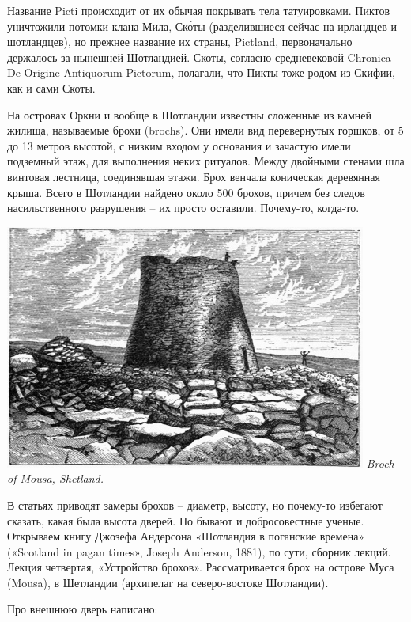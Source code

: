 Название Picti происходит от их обычая покрывать тела татуировками. Пиктов уничтожили потомки клана Мила, Ск\'оты (разделившиеся сейчас на ирландцев и шотландцев), но прежнее название их страны, Pictland, первоначально держалось за нынешней Шотландией. Скоты, согласно средневековой Chronica De Origine Anti\-quorum Pictorum, полагали, что Пикты тоже родом из Скифии, как и сами Скоты.

На островах Оркни и вообще в Шотландии известны сложенные из камней жилища, называемые брохи (brochs). Они имели вид перевернутых горшков, от 5 до 13 метров высотой, с низким входом у основания и зачастую имели подземный этаж, для выполнения неких ритуалов. Между двойными стенами шла винтовая лестница, соединявшая этажи. Брох венчала коническая деревянная крыша. Всего в Шотландии найдено около 500 брохов, причем без следов насильственного разрушения – их просто оставили. Почему-то, когда-то.

\begin{center}
\includegraphics[width=\linewidth]{chast-colebanie-osnov/letois/fig160_197.jpg}
\textit{Broch of Mousa, Shetland.}
\end{center}

В статьях приводят замеры брохов – диаметр, высоту, но почему-то избегают сказать, какая была высота дверей. Но бывают и добросовестные ученые. Открываем книгу Джозефа Андерсона «Шотландия в поганские времена» («Scotland in pagan times», Joseph Anderson, 1881), по сути, сборник лекций. Лекция четвертая, «Устройство брохов». Рассматривается брох на острове Муса (Mousa), в Шетландии (архипелаг на северо-востоке Шотландии).

Про внешнюю дверь написано:

